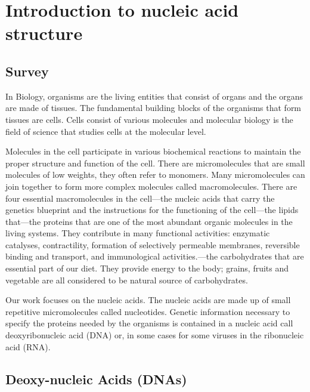\chapter{Introduction to nucleic acid structure }\label{ch:introduction}
\section{Survey}
In Biology, organisms are the living entities that consist of organs and the organs are made of tissues. The fundamental building blocks of the organisms that form tissues are cells. Cells consist of various molecules and molecular biology is the field of science that studies cells at the molecular level. 

Molecules in the cell participate in various biochemical reactions to maintain the proper structure and function of the cell. There are micromolecules that are small molecules of low weights, they often refer to monomers. Many micromolecules can join together to form more complex molecules called macromolecules. There are four essential macromolecules in the cell---the nucleic acids that carry the genetics blueprint and the instructions for the functioning of the cell---the lipids that---the proteins that are one of the most abundant organic molecules in the living systems. They contribute in many functional activities: enzymatic catalyses, contractility, formation of selectively permeable membranes, reversible binding and transport, and immunological activities.---the carbohydrates that are essential part of our diet. They provide energy to the body; grains, fruits and vegetable are all considered to be natural source of carbohydrates.
 
Our work focuses on the nucleic acids. The nucleic acids are made up of small repetitive micromolecules called nucleotides. Genetic information necessary to specify the proteins needed by the organisms is contained in a nucleic acid call deoxyribonucleic acid (DNA) or, in some cases for some viruses in the ribonucleic acid (RNA). 

\section{Deoxy-nucleic Acids (DNAs)}

